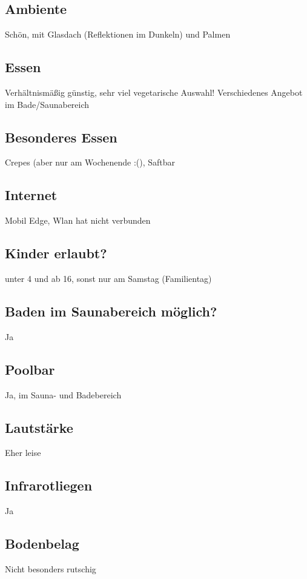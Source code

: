 \documentclass{article}
\begin{document}
\subsection*{Ambiente} Schön, mit Glasdach (Reflektionen im Dunkeln) und Palmen
\subsection*{Essen} Verhältnismäßig günstig, sehr viel vegetarische Auswahl! Verschiedenes Angebot im Bade/Saunabereich
\subsection*{Besonderes Essen} Crepes (aber nur am Wochenende :(), Saftbar
\subsection*{Internet} Mobil Edge, Wlan hat nicht verbunden
\subsection*{Kinder erlaubt?} unter 4 und ab 16, sonst nur am Samstag (Familientag)
\subsection*{Baden im Saunabereich möglich?} Ja
\subsection*{Poolbar} Ja, im Sauna- und Badebereich
\subsection*{Lautstärke} Eher leise
\subsection*{Infrarotliegen} Ja
\subsection*{Bodenbelag} Nicht besonders rutschig
\pagebreak
\end{document}
